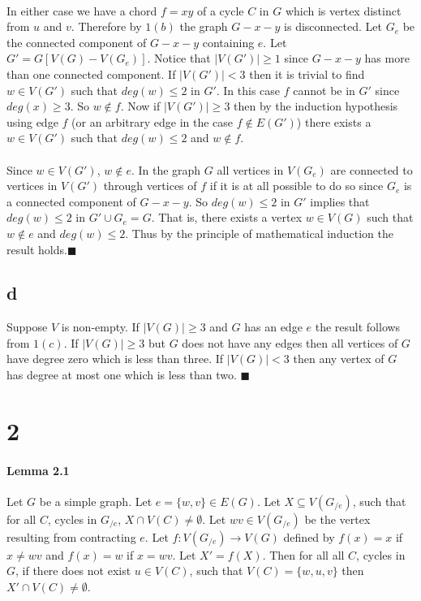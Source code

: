 \documentclass[letterpaper,12pt,oneside,onecolumn]{report}
\begin{document}
\paragraph{}
In either case we have a chord $f=xy$ of a cycle $C$ in $G$ which is vertex distinct from $u$ and $v$. Therefore by $1(b)$ the graph $G - x - y$ is disconnected. Let $G_e$ be the connected component of $G-x-y$ containing $e$. Let $G' = G[V(G) - V(G_e)]$. Notice that $|V(G')| \geq 1$ since $G - x- y$ has more than one connected component. If $|V(G')| < 3$ then it is trivial to find $w \in V(G')$ such that $deg(w) \leq 2$ in $G'$. In this case $f$ cannot be in $G'$ since $deg(x) \geq 3$. So $w \not \in f$. Now if $|V(G')| \geq 3$ then by the induction hypothesis using edge $f$ (or an arbitrary edge in the case $f \not \in E(G')$) there exists a $w \in V(G')$ such that $deg(w) \leq 2$ and $w \not \in f$.
\paragraph{}
Since $w \in V(G')$, $w \not \in e$. In the graph $G$ all vertices in $V(G_e)$ are connected to vertices in $V(G')$ through vertices of $f$ if it is at all possible to do so since $G_e$ is a connected component of $G - x - y$. So $deg(w) \leq 2$ in $G'$ implies that $deg(w) \leq 2$ in $G' \cup G_e = G$. That is, there exists a vertex $w \in V(G)$ such that $w \not\in e$ and $deg(w) \leq 2$. Thus by the principle of mathematical induction the result holds.$\blacksquare$
\subsection*{d}
Suppose $V$ is non-empty. If $|V(G)| \geq 3$ and $G$ has an edge $e$ the result follows from $1(c)$. If $|V(G)| \geq 3$ but $G$ does not have any edges then all vertices of $G$ have degree zero which is less than three. If $|V(G)| < 3$ then any vertex of $G$ has degree at most one which is less than two. $\blacksquare$
\section*{2}
\paragraph{Lemma 2.1}
Let $G$ be a simple graph. Let $e = \{w,v\} \in E(G)$. Let $X \subseteq V(G_{/e})$, such that for all $C$, cycles in $G_{/e}$, $X \cap V(C) \neq \emptyset$. Let $wv \in V(G_{/e})$ be the vertex resulting from contracting $e$. Let $f : V(G_{/e}) \rightarrow V(G)$ defined by $f(x) = x $ if $x \neq wv$ and $f(x) = w$ if $x = wv$. Let $X' = f(X)$. Then for all all $C$, cycles in $G$, if there does not exist $u \in V(C)$, such that $V(C) = \{w,u,v\}$ then $X' \cap V(C) \neq \emptyset$.
\end{document}
